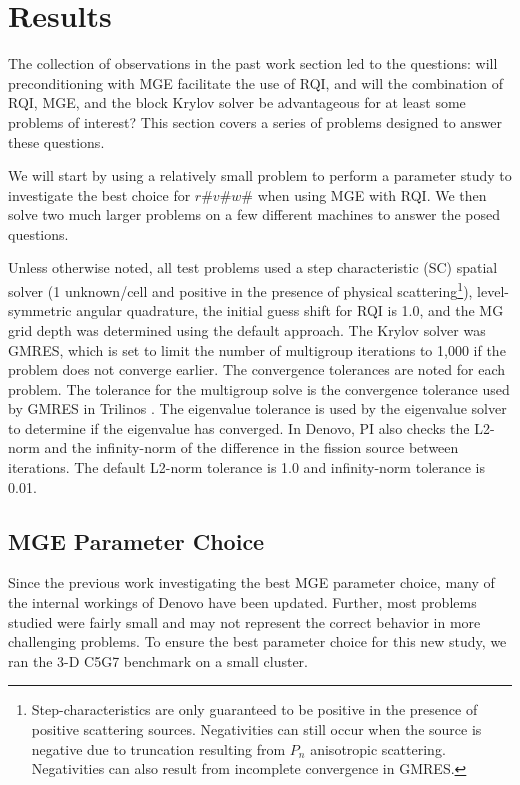 \documentclass{article}                                                                           %
\begin{document}
\section{Results}
\label{sec:results}
The collection of observations in the past work section led to the questions: will preconditioning with MGE facilitate the use of RQI, and will the combination of RQI, MGE, and the block Krylov solver be advantageous for at least some problems of interest? This section covers a series of problems designed to answer these questions.

We will start by using a relatively small problem to perform a parameter study to investigate the best choice for $r\#v\#w\#$ when using MGE with RQI.
We then solve two much larger problems on a few different machines to answer the posed questions.

Unless otherwise noted, all test problems used a step characteristic (SC) spatial solver (1 unknown/cell and positive in the presence of physical scattering\footnote{Step-characteristics are only guaranteed to be positive in the presence of positive scattering sources. Negativities can still occur when the source is negative due to truncation resulting from $P_n$ anisotropic scattering. Negativities can also result from incomplete convergence in GMRES.}), level-symmetric angular quadrature, the initial guess shift for RQI is 1.0, and the MG grid depth was determined using the default approach. 
The Krylov solver was GMRES, which is set to limit the number of multigroup iterations to 1,000 if the problem does not converge earlier. The convergence tolerances are noted for each problem. The tolerance for the multigroup solve is the convergence tolerance used by GMRES in Trilinos \cite{1089021}. The eigenvalue tolerance is used by the eigenvalue solver to determine if the eigenvalue has converged. In Denovo, PI also checks the L2-norm and the infinity-norm of the difference in the fission source between iterations. The default L2-norm tolerance is 1.0 and infinity-norm tolerance is 0.01.


\subsection{MGE Parameter Choice}
\label{subsec:mge-params}

Since the previous work investigating the best MGE parameter choice, many of the internal workings of Denovo have been updated. 
Further, most problems studied were fairly small and may not represent the correct behavior in more challenging problems. 
To ensure the best parameter choice for this new study, we ran the 3-D C5G7 benchmark on a small cluster. 
\end{document}
